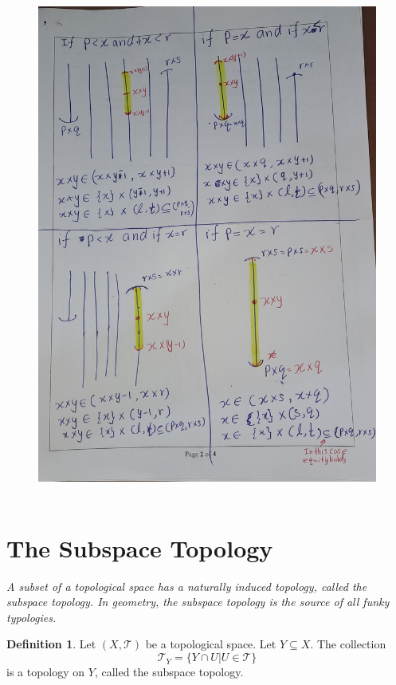 \documentclass[
]{book}
\theoremstyle{definition}
\newtheorem{definition}{Definition}[chapter]
\theoremstyle{definition}
\theoremstyle{definition}
\theoremstyle{definition}
\theoremstyle{remark}
\begin{document}
\begin{figure}
\centering
\includegraphics{figures/figure 12.jpg}
\caption{\label{fig:fig12}\(~\)}
\end{figure}

\hypertarget{the-subspace-topology}{%
\section{The Subspace Topology}\label{the-subspace-topology}}

\emph{A subset of a topological space has a naturally induced topology, called the subspace topology. In geometry, the subspace topology is the source of all funky typologies.}

\begin{definition}
\protect\hypertarget{def:unnamed-chunk-42}{}\label{def:unnamed-chunk-42}Let \((X, \mathcal{T})\) be a topological space. Let \(Y\subseteq X\). The collection
\[\mathcal{T}_Y = \{Y \cap U | U \in \mathcal{T}\}\] is a topology on \(Y\), called the subspace topology.
\end{definition}
\end{document}
